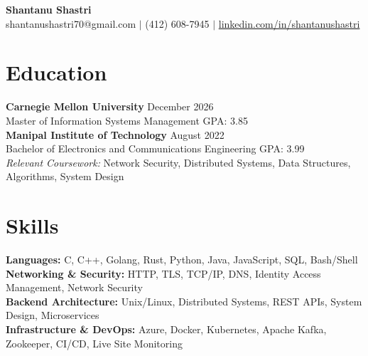 \documentclass[11pt,a4paper]{article}
\begin{document}
\begin{center}
    \Huge \textbf{Shantanu Shastri} \\
    \vspace{2pt}
    \small shantanushastri70@gmail.com $|$ (412) 608-7945 $|$ \href{https://linkedin.com/in/shantanushastri}{linkedin.com/in/shantanushastri}
\end{center}

\vspace{-5pt}
\section{Education}
\noindent
\textbf{Carnegie Mellon University} \hfill December 2026 \\
Master of Information Systems Management \hfill GPA: 3.85 \\
\textbf{Manipal Institute of Technology} \hfill August 2022 \\
Bachelor of Electronics and Communications Engineering \hfill GPA: 3.99 \\
\textit{Relevant Coursework:} Network Security, Distributed Systems, Data Structures, Algorithms, System Design

\vspace{-5pt}
\section{Skills}
\noindent
\textbf{Languages:} C, C++, Golang, Rust, Python, Java, JavaScript, SQL, Bash/Shell \\
\textbf{Networking \& Security:} HTTP, TLS, TCP/IP, DNS, Identity Access Management, Network Security \\
\textbf{Backend Architecture:} Unix/Linux, Distributed Systems, REST APIs, System Design, Microservices \\
\textbf{Infrastructure \& DevOps:} Azure, Docker, Kubernetes, Apache Kafka, Zookeeper, CI/CD, Live Site Monitoring

\vspace{-5pt}
\end{document}
